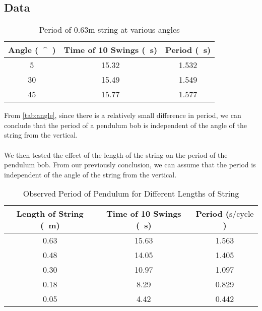 \documentclass[article, 12pt]{article}
\newcommand{\degree}{^\circ}
\begin{document}
    \subsection{Data}
    \begin{table}[H]
        \centering
        \begin{tabular}{|c|c|c|}
            \hline
            \textbf{Angle (\SI{}{\degree})} & \textbf{Time of 10 Swings (\SI{}{\second})} & \textbf{Period (\SI{}{\second})} \\
            \hline
            5  & 15.32 & 1.532 \\
            30 & 15.49 & 1.549 \\
            45 & 15.77 & 1.577 \\
            \hline
        \end{tabular}
        \caption{Period of 0.63m string at various angles}
        \label{tab:angle}
    \end{table}
    From \autoref{tab:angle}, since there is a relatively small difference in period, we can conclude that the period of a pendulum bob is independent of the angle of the string from the vertical. \\
    \\
    We then tested the effect of the length of the string on the period of the pendulum bob. From our previously conclusion, we can assume that the period is independent of the angle of the string from the vertical. \\
    \begin{table}[H]
        \centering
        \begin{tabular}{|c|c|c|}
            \hline
            \textbf{Length of String} (\SI{}{\meter}) & \textbf{Time of 10 Swings} (\SI{}{\second}) & \textbf{Period} ($\text{s}/\text{cycle}$) \\
            \hline
            0.63 & 15.63 & 1.563 \\
            0.48 & 14.05 & 1.405 \\
            0.30 & 10.97 & 1.097 \\
            0.18 & 8.29  & 0.829 \\
            0.05 & 4.42  & 0.442 \\ 
            \hline
        \end{tabular}
        \caption{Observed Period of Pendulum for Different Lengths of String}
        \label{tab:observedPeriod}
    \end{table}
\end{document}

